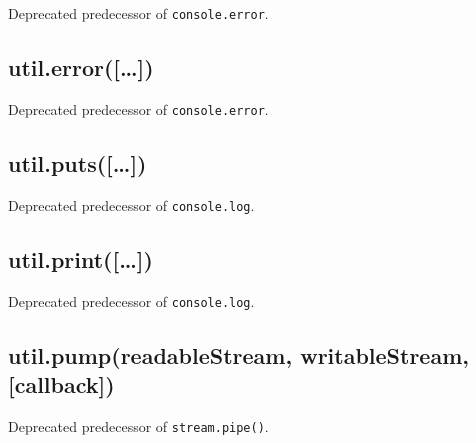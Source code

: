 Deprecated predecessor of \texttt{console.error}.

\subsection{util.error({[}\ldots{}{]})}

\begin{Shaded}
\begin{Highlighting}[]
\NormalTok{: } \NormalTok{- }\NormalTok{() }
\end{Highlighting}
\end{Shaded}

Deprecated predecessor of \texttt{console.error}.

\subsection{util.puts({[}\ldots{}{]})}

\begin{Shaded}
\begin{Highlighting}[]
\NormalTok{: } \NormalTok{- }\NormalTok{() }
\end{Highlighting}
\end{Shaded}

Deprecated predecessor of \texttt{console.log}.

\subsection{util.print({[}\ldots{}{]})}

\begin{Shaded}
\begin{Highlighting}[]
\NormalTok{: } \NormalTok{- }
\end{Highlighting}
\end{Shaded}

Deprecated predecessor of \texttt{console.log}.

\subsection{util.pump(readableStream, writableStream, {[}callback{]})}

\begin{Shaded}
\begin{Highlighting}[]
\NormalTok{: } \NormalTok{- }
\end{Highlighting}
\end{Shaded}

Deprecated predecessor of \texttt{stream.pipe()}.
